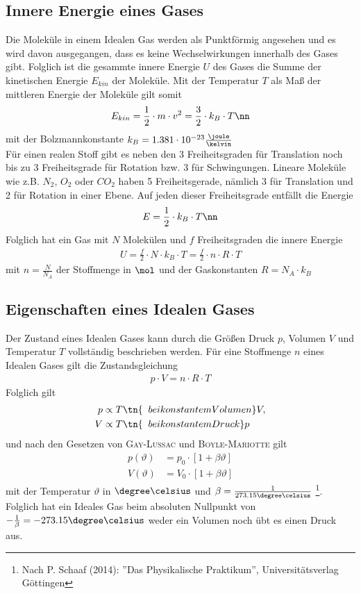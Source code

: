 \documentclass[12pt, a4paper, twoside]{scrartcl}
\newcommand{\person}[1]{\textsc{#1}}
\begin{document}
\subsection{Innere Energie eines Gases}
Die Moleküle in einem Idealen Gas werden als Punktförmig angesehen und es wird davon ausgegangen, dass es keine Wechselwirkungen innerhalb des Gases gibt.
Folglich ist die gesammte innere Energie $U$ des Gases die Summe der kinetischen Energie $E_{kin}$ der Moleküle. Mit der Temperatur $T$ als Maß der mittleren Energie der Moleküle gilt somit
\begin{align}
 E_{kin} = \frac{1}{2}\cdot m\cdot v^{2} = \frac{3}{2}\cdot k_B\cdot T \nn
\end{align}
mit der Bolzmannkonstante $k_B=1.381\cdot 10^{-23} \frac{\joule}{\kelvin}$
\\
Für einen realen Stoff gibt es neben den 3 Freiheitsgraden für Translation noch bis zu 3 Freiheitsgrade für Rotation bzw. 3 für Schwingungen. Lineare Moleküle wie z.B. $N_2$, $O_2$ oder $CO_2$ haben 5 Freiheitsgerade, nämlich 3 für Translation und 2 für Rotation in einer Ebene.
Auf jeden dieser Freiheitsgrade entfällt die Energie
\begin{align}
 E = \frac{1}{2}\cdot k_B\cdot T \nn
\end{align}
Folglich hat ein Gas mit $N$ Molekülen und $f$ Freiheitsgraden die innere Energie
\begin{align}
 U = \frac{f}{2}\cdot N\cdot k_B\cdot T = \frac{f}{2}\cdot n\cdot R\cdot T \label{eq:U}
\end{align}
mit $n = \frac{N}{N_A}$ der Stoffmenge in $\mol$ und  der Gaskonstanten $R = N_A\cdot k_B$

\subsection{Eigenschaften eines Idealen Gases}
\label{subsec:theorie_eigenschaften_ideales_gas}
Der Zustand eines Idealen Gases kann durch die Größen Druck $p$, Volumen $V$ und Temperatur $T$ vollständig beschrieben werden.
Für eine Stoffmenge $n$ eines Idealen Gases gilt die Zustandsgleichung
\begin{align}
 p\cdot V = n\cdot R\cdot T \label{eq:zustandsgleichung}
\end{align}
Folglich gilt
\begin{align*}
 p &\propto T \tn{\;\; bei konstantem Volumen } V, \\
 V &\propto T \tn{\;\; bei konstantem Druck } p 
\end{align*}
und nach den Gesetzen von \person{Gay-Lussac} und \person{Boyle-Mariotte} gilt
\begin{align*}
 p\left(\vartheta\right) &= p_0\cdot\left[1+\beta\vartheta\right] \\
 V\left(\vartheta\right) &= V_0\cdot\left[1+\beta\vartheta\right]
\end{align*}
mit der Temperatur $\vartheta$ in $\degree\celsius$ und $\beta = \frac{1}{273.15 \degree\celsius}$ \footnote{Nach P. Schaaf (2014): ”Das Physikalische Praktikum”, Universitätsverlag Göttingen}.
Folglich hat ein Ideales Gas beim absoluten Nullpunkt von $-\frac{1}{\beta} = -273.15 \degree\celsius$ weder ein Volumen noch übt es einen Druck aus.
\end{document}
